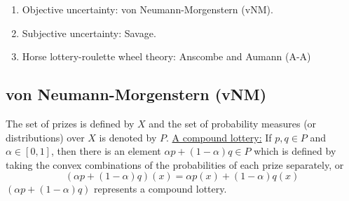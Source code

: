 \documentclass[11pt]{elegantbook}
\begin{document}
\begin{enumerate}[$\circ$]
    \item Objective uncertainty: von Neumann-Morgenstern (vNM).
    \item Subjective uncertainty: Savage.
    \item Horse lottery-roulette wheel theory: Anscombe and Aumann (A-A)
\end{enumerate}

\subsection{von Neumann-Morgenstern (vNM)}
The set of prizes is defined by $X$ and the set of probability measures (or distributions) over $X$ is denoted by $P$.
\underline{A compound lottery:} If $p,q\in P$ and $\alpha\in[0,1]$, then there is an element $\alpha p+(1-\alpha)q\in P$ which is defined by taking the convex combinations of the probabilities of each prize separately, or
$$(\alpha p+(1-\alpha)q)(x)=\alpha p(x)+(1-\alpha)q(x)$$
$(\alpha p+(1-\alpha)q)$ represents a compound lottery.
\end{document}
